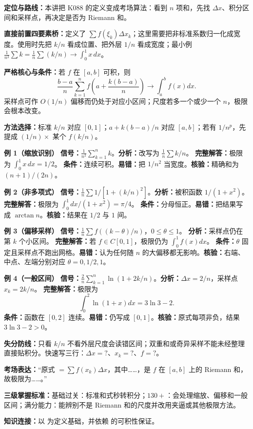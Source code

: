 \begin{knowledgeBox}
\textbf{定位与路线：}本讲把 K088 的定义变成考场算法：看到 \(n\) 项和，先找 \(\Delta x\)、积分区间和采样点，再决定是否为 Riemann 和。

\textbf{直接前置四要素桥：}定义了 \(\sum f(\xi_k)\Delta x_k\)；这里需要把非标准系数归一化成宽度。使用时先把 \(k/n\) 看成位置、把外层 \(1/n\) 看成宽度；最小例 \(\frac1{n^2}\sum k=\frac1n\sum(k/n)\to\int_0^1x\,dx\)。

\textbf{严格核心与条件：}若 \(f\) 在 \([a,b]\) 可积，则
\[
\frac{b-a}{n}\sum_{k=1}^n
f\!\left(a+\frac{k(b-a)}n\right)\to\int_a^bf(x)dx.
\]
采样点可作 \(O(1/n)\) 偏移而仍处于对应小区间；尺度若多一个或少一个 \(n\)，极限会根本改变。

\textbf{方法选择：}标准 \(k/n\) 对应 \([0,1]\)；\(a+k(b-a)/n\) 对应 \([a,b]\)；若有 \(1/n^p\)，先提成 \((1/n)\times\) 某个 \(f(k/n)\)。

\textbf{例 1（缩放识别）}\quad
\textbf{信号：}\(\frac1{n^2}\sum_{k=1}^nk\)。\textbf{分析：}改写为 \(\frac1n\sum k/n\)。
\textbf{完整解答：}极限为 \(\int_0^1x\,dx=1/2\)。
\textbf{条件：}连续可积。\textbf{易错：}把 \(1/n^2\) 当宽度。\textbf{核验：}精确和为 \((n+1)/(2n)\)。

\textbf{例 2（非多项式）}\quad
\textbf{信号：}\(\frac1n\sum1/[1+(k/n)^2]\)。\textbf{分析：}被积函数 \(1/(1+x^2)\)。
\textbf{完整解答：}极限为 \(\int_0^1dx/(1+x^2)=\pi/4\)。
\textbf{条件：}分母恒正。\textbf{易错：}把结果写成 \(\arctan n\)。\textbf{核验：}结果在 \(1/2\) 与 \(1\) 间。

\textbf{例 3（偏移采样）}\quad
\textbf{信号：}\(\frac1n\sum f((k-\theta)/n)\)，\(0\le\theta\le1\)。
\textbf{分析：}采样点仍在第 \(k\) 个小区间。
\textbf{完整解答：}若 \(f\in C[0,1]\)，极限仍为 \(\int_0^1f(x)dx\)。
\textbf{条件：}\(\theta\) 固定且采样点不跑出网格。\textbf{易错：}认为任何随 \(n\) 的大偏移都无影响。\textbf{核验：}右端、中点、左端分别对应 \(\theta=0,1/2,1\)。

\textbf{例 4（一般区间）}\quad
\textbf{信号：}\(\frac2n\sum_{k=1}^n\ln(1+2k/n)\)。\textbf{分析：}\(\Delta x=2/n\)，采样点 \(x_k=2k/n\)。
\textbf{完整解答：}极限为
\[
\int_0^2\ln(1+x)dx=3\ln3-2.
\]
\textbf{条件：}函数在 \([0,2]\) 连续。\textbf{易错：}仍写成 \([0,1]\)。\textbf{核验：}原式每项非负，结果 \(3\ln3-2>0\)。

\textbf{失分防线：}只看 \(k/n\) 不看外层尺度会读错区间；双重和或奇异采样不能未经整理直接贴积分。快速写三行：\(\Delta x=?\)、\(x_k=?\)、\(f=?\)。

\textbf{考场表达：}“原式 \(=\sum f(x_k)\Delta x\)，其中……，是 \(f\) 在 \([a,b]\) 上的 Riemann 和，故极限为……。”

\textbf{三级掌握标准：}基础过关：标准和式秒转积分；\(130+\)：会处理缩放、偏移和一般区间；满分能力：能辨别不是 Riemann 和的尺度并改用夹逼或其他极限方法。

\textbf{知识连接：}以 为定义基础，并依赖 的可积性保证。
\end{knowledgeBox}
